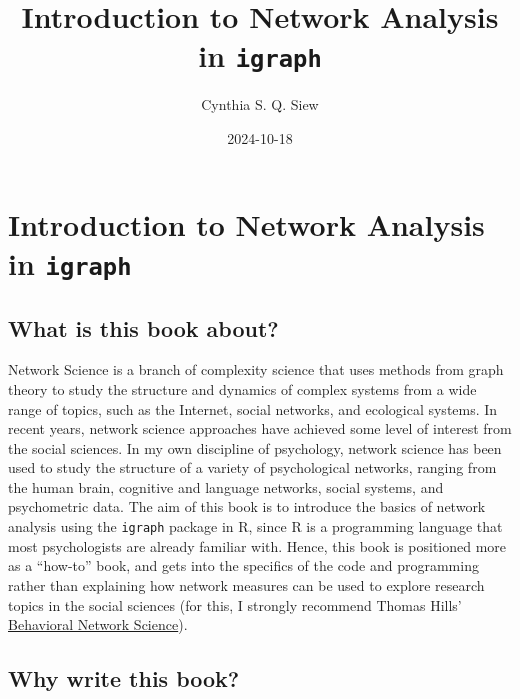\documentclass[
]{book}
\title{Introduction to Network Analysis in \texttt{igraph}}
\author{Cynthia S. Q. Siew}
\date{2024-10-18}
\begin{document}
\maketitle

{
\setcounter{tocdepth}{1}
\tableofcontents
}
\setcounter{section}{-1}

\chapter*{\texorpdfstring{Introduction to Network Analysis in \texttt{igraph}}{Introduction to Network Analysis in igraph}}\label{introduction-to-network-analysis-in-igraph}

\section{What is this book about?}\label{what-is-this-book-about}

Network Science is a branch of complexity science that uses methods from graph theory to study the structure and dynamics of complex systems from a wide range of topics, such as the Internet, social networks, and ecological systems. In recent years, network science approaches have achieved some level of interest from the social sciences. In my own discipline of psychology, network science has been used to study the structure of a variety of psychological networks, ranging from the human brain, cognitive and language networks, social systems, and psychometric data. The aim of this book is to introduce the basics of network analysis using the \texttt{igraph} package in R, since R is a programming language that most psychologists are already familiar with. Hence, this book is positioned more as a ``how-to'' book, and gets into the specifics of the code and programming rather than explaining how network measures can be used to explore research topics in the social sciences (for this, I strongly recommend Thomas Hills' \href{https://www.amazon.co.uk/Behavioral-Network-Science-Language-Society/dp/1108793339/}{Behavioral Network Science}).

\section{Why write this book?}\label{why-write-this-book}
\end{document}
